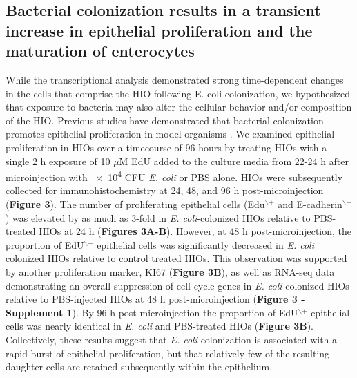 \documentclass[9pt,lineo]{elife}
\begin{document}
\subsection*{{\bfseries\sffamily } Bacterial colonization results in a transient increase in epithelial proliferation and the maturation of enterocytes}
\label{sec:orgheadline5}
While the transcriptional analysis demonstrated strong time-dependent changes in the cells that comprise the HIO following E. coli colonization, we hypothesized that exposure to bacteria may also alter the cellular behavior and/or composition of the HIO. Previous studies have demonstrated that bacterial colonization promotes epithelial proliferation in model organisms \citep{Bates:2006,Cheesman:2011,Neal:2013,Kremer:2013,Ijssennagger:2015}. We examined epithelial proliferation in HIOs over a timecourse of 96 hours by treating HIOs with a single 2 h exposure of 10 \(\mu\)M EdU added to the culture media from 22-24 h after microinjection with \num{e4} CFU \emph{E. coli} or PBS alone. HIOs were subsequently collected for immunohistochemistry at 24, 48, and 96 h post-microinjection (\textbf{Figure 3}). The number of proliferating epithelial cells (Edu\(^{\text{$\backslash$+}}\) and E-cadherin\(^{\text{$\backslash$+}}\)) was elevated by as much as 3-fold in \emph{E. coli}-colonized HIOs relative to PBS-treated HIOs at 24 h (\textbf{Figures 3A-B}). However, at 48 h post-microinjection, the proportion of EdU\(^{\text{$\backslash$+}}\) epithelial cells was significantly decreased in \emph{E. coli} colonized HIOs relative to control treated HIOs. This observation was supported by another proliferation marker, KI67 \citep{Gerdes:1984}(\textbf{Figure 3B}), as well as  RNA-seq data demonstrating an overall suppression of cell cycle genes in \emph{E. coli} colonized HIOs relative to PBS-injected HIOs at 48 h post-microinjection (\textbf{Figure 3 - Supplement 1}). By 96 h post-microinjection the proportion of EdU\(^{\text{$\backslash$+}}\) epithelial cells was nearly identical in \emph{E. coli} and PBS-treated HIOs (\textbf{Figure 3B}). Collectively, these results suggest that \emph{E. coli} colonization is associated with a rapid burst of epithelial proliferation, but that relatively few of the resulting daughter cells are retained subsequently within the epithelium. 
\end{document}
